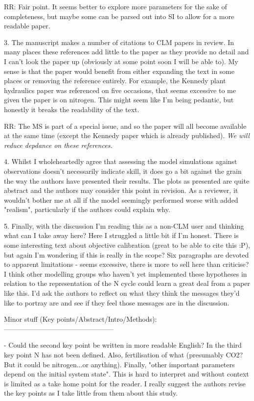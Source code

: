 \documentclass{article}
\begin{document}
RR: Fair point. It seems better to explore more parameters for the sake of completeness, but maybe some can be parsed out into SI to allow for a more readable paper. 

3. The manuscript makes a number of citations to CLM papers in review. In many places these references add little to the paper as they provide no detail and I can't look the paper up (obviously at some point soon I will be able to). My sense is that the paper would benefit from either expanding the text in some places or removing the reference entirely. For example, the Kennedy plant hydraulics paper was referenced on five occasions, that seems excessive to me given the paper is on nitrogen. This might seem like I'm being pedantic, but honestly it breaks the readability of the text. 

RR: The MS is part of a special issue, and so the paper will all become available at the same time (except the Kennedy paper which is already published). \emph{We will reduce depdance on these references.} 

4. Whilst I wholeheartedly agree that assessing the model simulations against observations doesn't necessarily indicate skill, it does go a bit against the grain the way the authors have presented their results. The plots as presented are quite abstract and the authors may consider this point in revision. As a reviewer, it wouldn't bother me at all if the model seemingly performed worse with added "realism", particularly if the authors could explain why. 



5. Finally, with the discussion I'm reading this as a non-CLM user and thinking what can I take away here? Here I struggled a little bit if I'm honest. There is some interesting text about objective calibration (great to be able to cite this :P), but again I'm wondering if this is really in the scope? Six paragraphs are devoted to apparent limitations - seems excessive, there is more to sell here than criticise? I think other modelling groups who haven't yet implemented these hypotheses in relation to the representation of the N cycle could learn a great deal from a paper like this. I'd ask the authors to reflect on what they think the messages they'd like to portray are and see if they feel those messages are in the discussion. 



Minor stuff (Key points/Abstract/Intro/Methods): 
------------------------------------------------ 

- Could the second key point be written in more readable English? In the third key point N has not been defined. Also, fertilisation of what (presumably CO2? But it could be nitrogen...or anything). Finally, "other important parameters depend on the initial system state". This is hard to interpret and without context is limited as a take home point for the reader. I really suggest the authors revise the key points as I take little from them about this study. 
\end{document}
